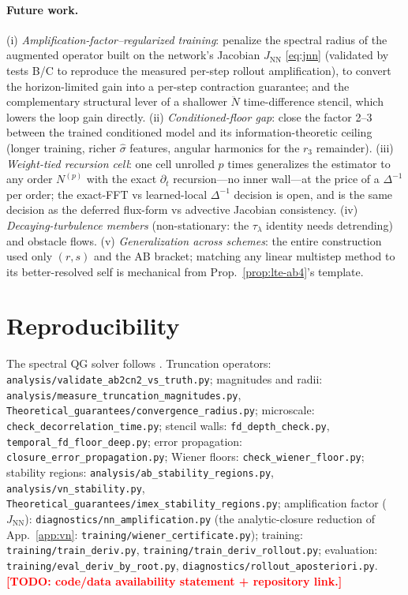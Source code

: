 \documentclass[11pt]{article}
\theoremstyle{plain}
\theoremstyle{definition}
\newcommand{\TODO}[1]{\textcolor{red}{\textbf{[TODO: #1]}}}
\newcommand{\Nddot}{\ddot{N}}
\newcommand{\taul}{\tau_{\lambda}}
\newcommand{\shat}{\hat{\sigma}}
\begin{document}
\paragraph{Future work.}
(i) \emph{Amplification-factor--regularized training}: penalize the spectral
radius of the augmented operator built on the network's Jacobian
$J_{\mathrm{NN}}$ \eqref{eq:jnn} (validated by tests B/C to reproduce the
measured per-step rollout amplification), to convert the horizon-limited gain
into a per-step contraction guarantee; and the complementary structural lever
of a shallower $\Nddot$ time-difference stencil, which lowers the loop gain
directly.
(ii) \emph{Conditioned-floor gap}: close the factor 2--3 between the trained
conditioned model and its information-theoretic ceiling (longer training,
richer $\shat$ features, angular harmonics for the $r_3$ remainder).
(iii) \emph{Weight-tied recursion cell}: one cell unrolled $p$ times
generalizes the estimator to any order $N^{(p)}$ with the exact $\partial_t$
recursion---no inner wall---at the price of a $\Delta^{-1}$ per order; the
exact-FFT vs learned-local $\Delta^{-1}$ decision is open, and is the same
decision as the deferred flux-form vs advective Jacobian consistency.
(iv) \emph{Decaying-turbulence members} (non-stationary: the $\taul$ identity
needs detrending) and obstacle flows.
(v) \emph{Generalization across schemes}: the entire construction used only
$(r,s)$ and the AB bracket; matching any linear multistep method to its
better-resolved self is mechanical from Prop.~\ref{prop:lte-ab4}'s template.

\section*{Reproducibility}
\begin{sloppypar}
The spectral QG solver follows \citet{sureshbabu2025}. Truncation operators:
\texttt{analysis/validate\_ab2cn2\_vs\_truth.py}; magnitudes and radii:
\texttt{analysis/measure\_truncation\_magnitudes.py},
\texttt{Theoretical\_guarantees/convergence\_radius.py}; microscale:
\texttt{check\_decorrelation\_time.py}; stencil walls:
\texttt{fd\_depth\_check.py}, \texttt{temporal\_fd\_floor\_deep.py}; error
propagation: \texttt{closure\_error\_propagation.py}; Wiener floors:
\texttt{check\_wiener\_floor.py}; stability regions:
\texttt{analysis/ab\_stability\_regions.py},
\texttt{analysis/vn\_stability.py},
\texttt{Theoretical\_guarantees/imex\_stability\_regions.py}; amplification
factor ($J_{\mathrm{NN}}$): \texttt{diagnostics/nn\_amplification.py} (the
analytic-closure reduction of App.~\ref{app:vn}:
\texttt{training/wiener\_certificate.py}); training:
\texttt{training/train\_deriv.py}, \texttt{training/train\_deriv\_rollout.py};
evaluation: \texttt{training/eval\_deriv\_by\_root.py},
\texttt{diagnostics/rollout\_aposteriori.py}.
\TODO{code/data availability statement + repository link.}
\end{sloppypar}
\end{document}
